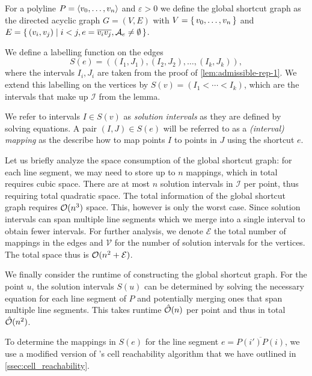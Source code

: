 \begin{definition}
	For a polyline \(P = \left\langle v_0, \dots, v_n\right\rangle\) and \(\varepsilon > 0\) we define the global shortcut graph as the directed acyclic graph \(G = (V, E)\) with \(V = \set{v_0, \dots, v_n}\) and \(E = \set{(v_i, v_j) \mid i < j, e = \overline{v_iv_j}, \mathcal{A}_e \neq \emptyset}\).

	We define a labelling function on the edges 
	\[S(e) = ((I_1, J_1), (I_2, J_2), \dots, (I_k, J_k)),\]
	where the intervals \(I_i, J_i\) are taken from the proof of \cref{lem:admissible-rep-1}. We extend this labelling on the vertices by \(S(v) = (I_1 < \cdots < I_k)\), which are the intervals that make up \(\mathcal{I}\) from the lemma.

	We refer to intervals \(I \in S(v)\) as \emph{solution intervals} as they are defined by solving equations. A pair \((I, J) \in S(e)\) will be referred to as a \emph{(interval) mapping} as the describe how to map points \(I\) to points in \(J\) using the shortcut \(e\).
\end{definition}

Let us briefly analyze the space consumption of the global shortcut graph: for each line segment, we may need to store up to \(n\) mappings, which in total requires cubic space. There are at most \(n\) solution intervals in \(\mathcal{I}\) per point, thus requiring total quadratic space. The total information of the global shortcut graph requires \(\mathcal{O}(n^3)\) space. This, however is only the worst case. Since solution intervals can span multiple line segments which we merge into a single interval to obtain fewer intervals. For further analysis, we denote \(\mathcal{E}\) the total number of mappings in the edges and \(\mathcal{V}\) for the number of solution intervals for the vertices. The total space thus is \(\mathcal{O}(n^2 + \mathcal{E})\).

We finally consider the runtime of constructing the global shortcut graph. For the point \(u\), the solution intervals \(S(u)\) can be determined by solving the necessary equation for each line segment of \(P\) and potentially merging ones that span multiple line segments. This takes runtime \(\hat{\mathcal{O}}(n)\) per point and thus in total \(\hat{\mathcal{O}}(n^2)\). 

To determine the mappings in \(S(e)\) for the line segment \(e = \overline{P(i')P(i)}\), we use a modified version of \citeauthor{polyline_simplification_has_cubic_complexity_bringmannetal}'s cell reachability algorithm that we have outlined in \cref{ssec:cell_reachability}.

